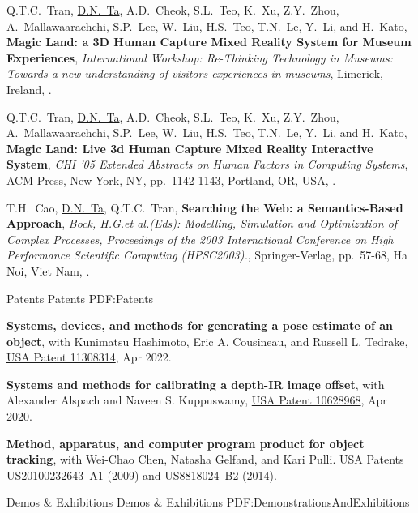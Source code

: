 \documentclass[letterpaper,MMMyyyy,nonstopmode]{simpleresumecv}
\begin{document}
\begin{Body}
\Gap
\NumberedItem{[3]}
{ Q.T.C.~Tran, \underline{D.N.~Ta},  A.D.~Cheok, S.L.~Teo, K.~Xu, Z.Y.~Zhou, A.~Mallawaarachchi, S.P.~Lee, W.~Liu, H.S.~Teo, T.N.~Le, Y.~Li, and H.~Kato,
\textbf{Magic Land: a 3D Human Capture Mixed Reality System for Museum Experiences},
\textit{International Workshop: Re-Thinking Technology in Museums: Towards a new understanding of visitors experiences in museums},
Limerick, Ireland,
.}

\Gap
\NumberedItem{[2]}
{ Q.T.C.~Tran, \underline{D.N.~Ta},  A.D.~Cheok, S.L.~Teo, K.~Xu, Z.Y.~Zhou, A.~Mallawaarachchi, S.P.~Lee, W.~Liu, H.S.~Teo, T.N.~Le, Y.~Li, and H.~Kato,
\textbf{Magic Land: Live 3d Human Capture Mixed Reality Interactive System},
\textit{CHI '05 Extended Abstracts on Human Factors in Computing Systems},
ACM Press, New York, NY,
pp.~1142-1143,
Portland, OR, USA,
.}


\Gap
\NumberedItem{[1]}
{ T.H.~Cao, \underline{D.N.~Ta}, Q.T.C.~Tran,
\textbf{Searching the Web: a Semantics-Based Approach},
\textit{Bock, H.G.et al.(Eds): Modelling, Simulation and Optimization of Complex Processes, Proceedings of the 2003 International Conference on High Performance Scientific Computing (HPSC2003).},
Springer-Verlag,
pp.~57-68,
Ha Noi, Viet Nam,
.}


\Section
{Patents}
{Patents}
{PDF:Patents}

\BulletItem
\textbf{Systems, devices, and methods for generating a pose estimate of an object}, with Kunimatsu Hashimoto, Eric A. Cousineau, and Russell L. Tedrake, \href{https://www.freepatentsonline.com/11308314.html}{USA Patent 11308314}, Apr 2022.

\BulletItem
\textbf{Systems and methods for calibrating a depth-IR image offset}, with Alexander Alspach and Naveen S. Kuppuswamy, \href{https://www.freepatentsonline.com/10628968.html}{USA Patent 10628968}, Apr 2020.

\BulletItem
\textbf{Method, apparatus, and computer program product for object tracking}, with Wei-Chao Chen, Natasha Gelfand, and Kari Pulli. USA Patents \href{https://www.freepatentsonline.com/y2010/0232643.html}{US20100232643~A1} (2009) and \href{https://www.freepatentsonline.com/8818024.html}{US8818024~B2} (2014).


\Section
{Demos \& Exhibitions}
{Demos \& Exhibitions}
{PDF:DemonstrationsAndExhibitions}


\end{Body}
\end{document}
